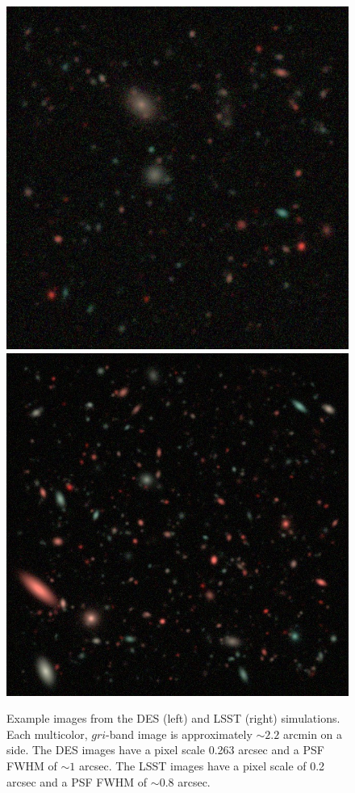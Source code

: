 \documentclass[fleqn,useAMS,usenatbib]{mnras}
\begin{document}
\begin{figure}
    \includegraphics[width=0.9\columnwidth]{figures/des_gri.jpg}
    \includegraphics[width=0.9\columnwidth]{figures/lsst_gri.jpg}
    \caption{
        Example images from the DES (left) and LSST (right) simulations. Each
        multicolor, $gri$-band image is approximately $\sim\!2.2$ arcmin on a side. The
        DES images have a pixel scale 0.263 arcsec and a PSF FWHM of $\sim\!1$ arcsec.
        The LSST images have a pixel scale of 0.2 arcsec and a PSF FWHM of $\sim\!0.8$
        arcsec.
        \label{fig:simimages}}
\end{figure}
\end{document}
